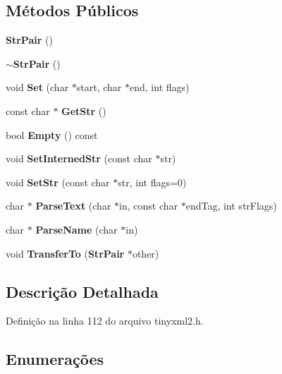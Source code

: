 \subsection*{Métodos Públicos}
\begin{DoxyCompactItemize}
\item 
{\bf Str\+Pair} ()
\item 
{\bf $\sim$\+Str\+Pair} ()
\item 
void {\bf Set} (char $\ast$start, char $\ast$end, int flags)
\item 
const char $\ast$ {\bf Get\+Str} ()
\item 
bool {\bf Empty} () const 
\item 
void {\bf Set\+Interned\+Str} (const char $\ast$str)
\item 
void {\bf Set\+Str} (const char $\ast$str, int flags=0)
\item 
char $\ast$ {\bf Parse\+Text} (char $\ast$in, const char $\ast$end\+Tag, int str\+Flags)
\item 
char $\ast$ {\bf Parse\+Name} (char $\ast$in)
\item 
void {\bf Transfer\+To} ({\bf Str\+Pair} $\ast$other)
\end{DoxyCompactItemize}


\subsection{Descrição Detalhada}


Definição na linha 112 do arquivo tinyxml2.\+h.



\subsection{Enumerações}
